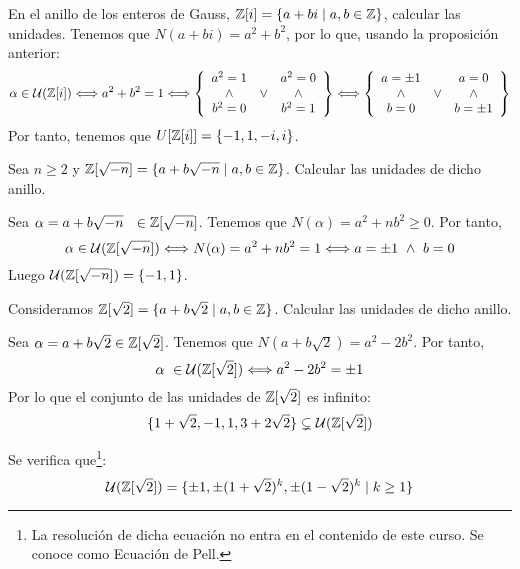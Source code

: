 \begin{ejemplo}
    En el anillo de los enteros de Gauss, $\mathbb Z[i] = \{a+bi \mid a,b \in \mathbb Z\}$, calcular las unidades. Tenemos que $N(a+bi) = a^2 + b^2$, por lo que, usando la proposición anterior:
    \begin{equation*}
        \alpha \in \mathcal{U}(\mathbb Z[i]) \Longleftrightarrow a^2 + b^2 = 1 \Longleftrightarrow \left\{ \begin{array}{ccc}
            a^2 = 1 &  & a^2 = 0 \\
            \land    &  \lor  &  \land       \\
            b^2 = 0 &  & b^2 = 1
        \end{array} \right\}
        \Longleftrightarrow \left\{ \begin{array}{ccc}
            a = \pm 1 & & a = 0     \\
            \land    &  \lor  &  \land \\
            b = 0     & & b = \pm 1
        \end{array} \right\}
    \end{equation*}
    Por tanto, tenemos que $U[\mathbb Z[i]] = \{-1, 1, -i, i\}$.
\end{ejemplo}

\begin{ejemplo}
    Sea $n \geq 2$ y $\mathbb Z[\sqrt{-n}] = \{a+b\sqrt{-n} \mid a,b \in \mathbb Z\}$. Calcular las unidades de dicho anillo.

    Sea $\alpha = a+b\sqrt{-n}~~\in \mathbb Z[\sqrt{-n}]$. Tenemos que $N(\alpha)=a^2+nb^2\geq 0$. Por tanto,
    $$\alpha \in \mathcal{U}(\mathbb Z[\sqrt{-n}]) \Longleftrightarrow N(\alpha) = a^2 + nb^2 = 1 \Longleftrightarrow a=\pm 1 \ \land \  b = 0$$
    Luego $\mathcal{U}(\mathbb Z[\sqrt{-n}]) = \{-1, 1\}$.
\end{ejemplo}

\begin{ejemplo}
    Consideramos $\mathbb Z[\sqrt{2}] = \{a+b\sqrt{2} \mid a,b \in \mathbb Z\}$. Calcular las unidades de dicho anillo.

    Sea $\alpha=a+b\sqrt{2} \in \mathbb Z[\sqrt{2}]$. Tenemos que $N(a+b\sqrt{2}) = a^2-2b^2$. Por tanto,
    $$\alpha~\in \mathcal{U}(\mathbb Z[\sqrt{2}]) \Longleftrightarrow a^2-2b^2 = \pm 1$$
    Por lo que el conjunto de las unidades de $\mathbb Z[\sqrt{2}]$ es infinito:
    $$\{1+\sqrt{2}, -1, 1, 3+2\sqrt{2}\}\subsetneq \mathcal{U}(\mathbb Z[\sqrt{2}])$$
    
    Se verifica que\footnote{La resolución de dicha ecuación no entra en el contenido de este curso. Se conoce como Ecuación de Pell.}:
    $$\mathcal{U}(\mathbb Z[\sqrt{2}]) = \{\pm 1, \pm (1+\sqrt{2})^k, \pm (1-\sqrt{2})^k\mid k\geq 1\}$$
\end{ejemplo}


